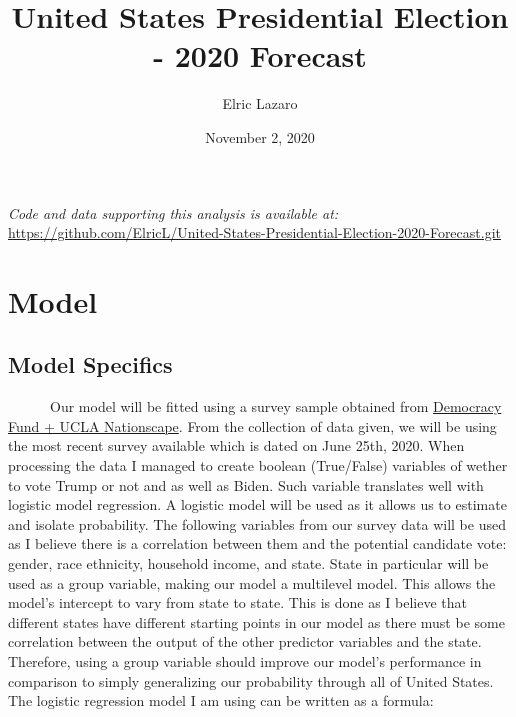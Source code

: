 \documentclass[
]{article}
\title{United States Presidential Election - 2020 Forecast}
\author{Elric Lazaro}
\date{November 2, 2020}
\begin{document}
\maketitle

\emph{Code and data supporting this analysis is available at:}\\
\url{https://github.com/ElricL/United-States-Presidential-Election-2020-Forecast.git}

\hypertarget{model}{%
\section{Model}\label{model}}

\hypertarget{model-specifics}{%
\subsection{Model Specifics}\label{model-specifics}}

~~~~~~Our model will be fitted using a survey sample obtained from
\href{https://www.voterstudygroup.org/publication/nationscape-data-set}{Democracy
Fund + UCLA Nationscape}. From the collection of data given, we will be
using the most recent survey available which is dated on June 25th,
2020. When processing the data I managed to create boolean (True/False)
variables of wether to vote Trump or not and as well as Biden. Such
variable translates well with logistic model regression. A logistic
model will be used as it allows us to estimate and isolate probability.
The following variables from our survey data will be used as I believe
there is a correlation between them and the potential candidate vote:
gender, race ethnicity, household income, and state. State in particular
will be used as a group variable, making our model a multilevel model.
This allows the model's intercept to vary from state to state. This is
done as I believe that different states have different starting points
in our model as there must be some correlation between the output of the
other predictor variables and the state. Therefore, using a group
variable should improve our model's performance in comparison to simply
generalizing our probability through all of United States. The logistic
regression model I am using can be written as a formula:
\end{document}
